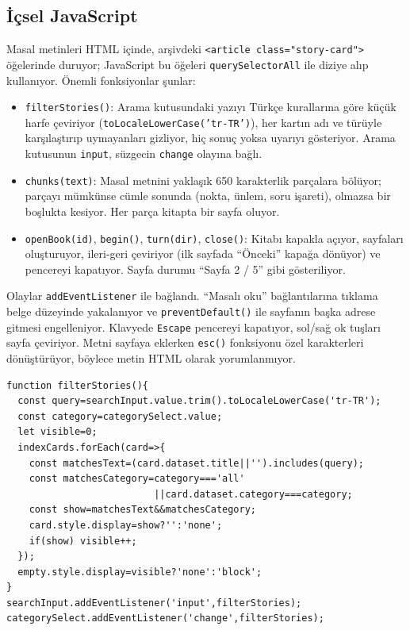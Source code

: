 \documentclass[12pt,a4paper]{article}
\begin{document}
\subsection{İçsel JavaScript}
Masal metinleri HTML içinde, arşivdeki \texttt{<article class="story-card">} öğelerinde
duruyor; JavaScript bu öğeleri \texttt{querySelectorAll} ile diziye alıp kullanıyor.
Önemli fonksiyonlar şunlar:
\begin{itemize}
  \item \texttt{filterStories()}: Arama kutusundaki yazıyı Türkçe kurallarına göre küçük
  harfe çeviriyor (\texttt{toLocaleLowerCase('tr-TR')}), her kartın adı ve türüyle
  karşılaştırıp uymayanları gizliyor, hiç sonuç yoksa uyarıyı gösteriyor.
  Arama kutusunun \texttt{input}, süzgecin \texttt{change} olayına bağlı.
  \item \texttt{chunks(text)}: Masal metnini yaklaşık 650 karakterlik parçalara bölüyor;
  parçayı mümkünse cümle sonunda (nokta, ünlem, soru işareti), olmazsa bir boşlukta kesiyor.
  Her parça kitapta bir sayfa oluyor.
  \item \texttt{openBook(id)}, \texttt{begin()}, \texttt{turn(dir)}, \texttt{close()}: Kitabı
  kapakla açıyor, sayfaları oluşturuyor, ileri-geri çeviriyor (ilk sayfada ``Önceki'' kapağa
  dönüyor) ve pencereyi kapatıyor. Sayfa durumu ``Sayfa 2 / 5'' gibi gösteriliyor.
\end{itemize}
Olaylar \texttt{addEventListener} ile bağlandı. ``Masalı oku'' bağlantılarına tıklama
belge düzeyinde yakalanıyor ve \texttt{preventDefault()} ile sayfanın başka adrese gitmesi
engelleniyor. Klavyede \texttt{Escape} pencereyi kapatıyor, sol/sağ ok tuşları sayfa
çeviriyor. Metni sayfaya eklerken \texttt{esc()} fonksiyonu özel karakterleri
dönüştürüyor, böylece metin HTML olarak yorumlanmıyor.

\begin{lstlisting}[caption={İçsel JavaScript'ten önemli bir bölüm}]
function filterStories(){
  const query=searchInput.value.trim().toLocaleLowerCase('tr-TR');
  const category=categorySelect.value;
  let visible=0;
  indexCards.forEach(card=>{
    const matchesText=(card.dataset.title||'').includes(query);
    const matchesCategory=category==='all'
                          ||card.dataset.category===category;
    const show=matchesText&&matchesCategory;
    card.style.display=show?'':'none';
    if(show) visible++;
  });
  empty.style.display=visible?'none':'block';
}
searchInput.addEventListener('input',filterStories);
categorySelect.addEventListener('change',filterStories);
\end{lstlisting}
\end{document}
